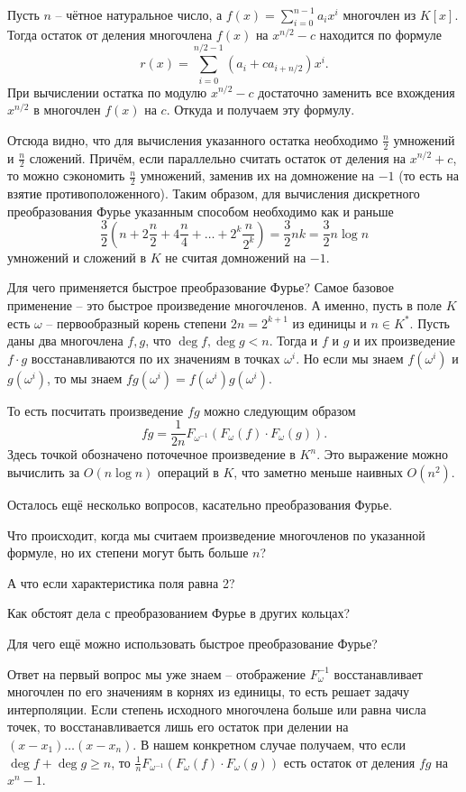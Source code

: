 \lm Пусть $n$ -- чётное натуральное число, а $f(x)=\sum_{i=0}^{n-1} a_ix^i$ многочлен из $K[x]$. Тогда остаток от деления многочлена $f(x)$ на $x^{n/2}-c$ находится по формуле
$$r(x)=\sum_{i=0}^{n/2-1}(a_i+ca_{i+n/2})x^{i}. $$
\elm
\proof При вычислении остатка по модулю $x^{n/2}-c$ достаточно заменить все вхождения $x^{n/2}$ в многочлен $f(x)$ на $c$. Откуда и получаем эту формулу.
\endproof

Отсюда видно, что для вычисления указанного остатка необходимо $\frac{n}{2}$ умножений и $\frac{n}{2}$ сложений. Причём, если параллельно считать остаток от деления на $x^{n/2}+c$, то можно сэкономить $\frac{n}{2}$ умножений, заменив их на домножение на $-1$ (то есть на взятие противоположенного). Таким образом,  для вычисления дискретного преобразования Фурье указанным способом необходимо как и раньше
$$\frac{3}{2}\left(n+2\frac{n}{2}+4\frac{n}{4}+\dots+2^k\frac{n}{2^k}\right)=\frac{3}{2}nk=\frac{3}{2}n\log n$$
умножений и сложений  в $K$ не считая домножений на $-1$.

Для чего применяется быстрое преобразование Фурье? Самое базовое применение -- это быстрое произведение многочленов. А именно, пусть в поле $K$ есть $\omega$ -- первообразный корень степени $2n=2^{k+1}$ из единицы и $n \in K^*$. Пусть даны два многочлена $f,g$, что $\deg f, \deg g <n$. Тогда и $f$ и $g$  и их произведение $f\cdot g$ восстанавливаются по их значениям в точках $\omega^i$. Но если мы знаем $f(\omega^i)$ и $g(\omega^i)$, то мы знаем $fg(\omega^i)=f(\omega^i)g(\omega^i)$.

То есть посчитать произведение $fg$ можно следующим образом $$fg= \frac{1}{2n}F_{\omega^{-1}}\left(F_{\omega}(f)\cdot F_{\omega}(g)\right).$$
Здесь точкой обозначено поточечное произведение в $K^n$. Это выражение можно вычислить за $O(n\log n)$ операций в $K$, что заметно меньше наивных $O(n^2)$.

Осталось ещё несколько вопросов, касательно преобразования Фурье. 

\enm 
\item Что происходит, когда мы считаем произведение многочленов по указанной формуле, но их степени могут быть больше $n$?
\item А что если характеристика поля равна 2?
\item Как обстоят дела с преобразованием Фурье в других кольцах?
\item Для чего ещё можно использовать быстрое преобразование Фурье?
\eenm

Ответ на первый вопрос мы уже знаем -- отображение $F_{\omega}^{-1}$ восстанавливает многочлен по его значениям в корнях из единицы, то есть решает задачу интерполяции. Если степень исходного многочлена больше  или равна числа точек, то восстанавливается лишь его остаток при делении на $(x-x_1)\dots(x-x_n)$. В нашем конкретном случае получаем, что если $\deg f+\deg g \geq n$, то $\frac{1}{n}F_{\omega^{-1}}\left(F_{\omega}(f)\cdot F_{\omega}(g)\right)$ есть остаток от деления $fg$ на $x^n-1$.  


